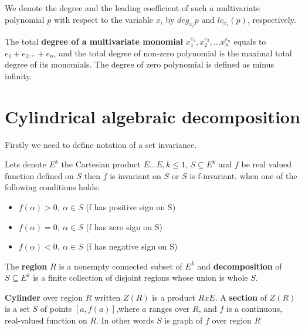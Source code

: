 \documentclass[
  digital, %
  twoside, %
  table,   %
  nolof,     %
  nolot,     %
]{fithesis3}
\begin{document}
We denote the degree and the leading coefficient of such a multivariate polynomial $p$ with respect to the variable $x_i$ by $deg_{x_i} p$ and $lc_{x_i}(p)$, respectively. 

The total \textbf{degree of a multivariate monomial} $x_1^{e_1}, x_2^{e_2}, \dots x_n^{e_n}$ equals to  $e_1 + e_2 \dots + e_n$, and the total degree of non-zero polynomial is the maximal total degree of its monomials.\cite{gathen_gerhard_2013} The degree of zero polynomial is defined as minus infinity.

\section{Cylindrical algebraic decomposition}
Firstly we need to define notation of a set invariance. 
\begin{definition}
Lets denote $E^k$ the Cartesian product $E \dots E, k \leq 1$, $S \subseteq E^k$ and $f$ be real valued function defined on $S$ then $f$ is invariant on $S$ or $S$ is f-invariant, when one of the following conditions holds:
\begin{itemize}
    \item $f(\alpha) > 0,\ \alpha \in S$ (f has positive sign on S) 
    \item $f(\alpha) = 0,\ \alpha \in S$ (f has zero sign on S)
    \item $f(\alpha) < 0,\ \alpha \in S$ (f has negative sign on S) 
\end{itemize}
\end{definition}

\begin{definition}
The \textbf{region} $R$ is a nonempty connected subset of $E^k$ and \textbf{decomposition} of $S \subseteq E^k$ is a finite collection of disjoint regions whose union is whole $S$.
\end{definition}

\begin{definition}
\textbf{Cylinder} over region $R$ written $Z(R)$ is a product $R x E$.
\newline
A \textbf{section} of $Z(R)$ is a set $S$ of points $[a, f(a)]$,where $a$ ranges over $R$, and $f$ is a continuous, real-valued function on $R$. In other words $S$ is graph of $f$ over region $R$
\end{definition}
\end{document}

